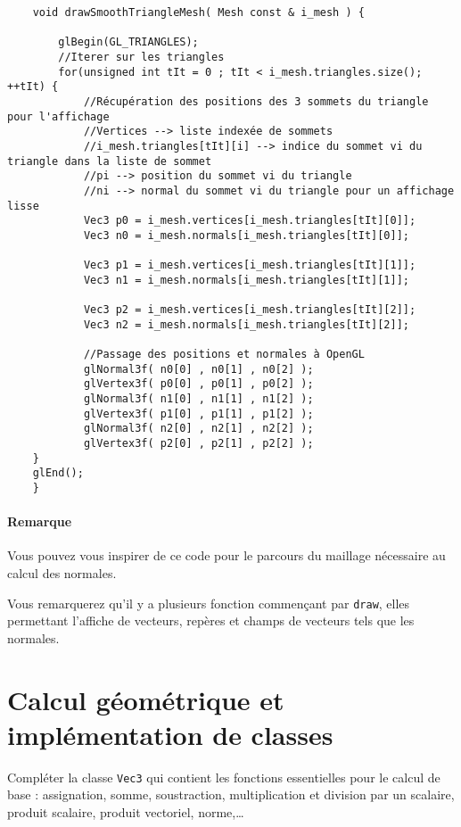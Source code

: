 \documentclass[a4paper,10pt]{tp_um}
\newcommand\code[1]{\texttt{#1}}
\begin{document}
\begin{verbatim}
    void drawSmoothTriangleMesh( Mesh const & i_mesh ) {
        
        glBegin(GL_TRIANGLES);
        //Iterer sur les triangles
        for(unsigned int tIt = 0 ; tIt < i_mesh.triangles.size(); ++tIt) {
            //Récupération des positions des 3 sommets du triangle pour l'affichage
            //Vertices --> liste indexée de sommets 
            //i_mesh.triangles[tIt][i] --> indice du sommet vi du triangle dans la liste de sommet 
            //pi --> position du sommet vi du triangle
            //ni --> normal du sommet vi du triangle pour un affichage lisse
            Vec3 p0 = i_mesh.vertices[i_mesh.triangles[tIt][0]];
            Vec3 n0 = i_mesh.normals[i_mesh.triangles[tIt][0]];

            Vec3 p1 = i_mesh.vertices[i_mesh.triangles[tIt][1]];
            Vec3 n1 = i_mesh.normals[i_mesh.triangles[tIt][1]];

            Vec3 p2 = i_mesh.vertices[i_mesh.triangles[tIt][2]];
            Vec3 n2 = i_mesh.normals[i_mesh.triangles[tIt][2]];

            //Passage des positions et normales à OpenGL
            glNormal3f( n0[0] , n0[1] , n0[2] );
            glVertex3f( p0[0] , p0[1] , p0[2] );
            glNormal3f( n1[0] , n1[1] , n1[2] );
            glVertex3f( p1[0] , p1[1] , p1[2] );
            glNormal3f( n2[0] , n2[1] , n2[2] );
            glVertex3f( p2[0] , p2[1] , p2[2] );
    }
    glEnd();
    }
 \end{verbatim}
\paragraph{Remarque}
Vous pouvez vous inspirer de ce code pour le parcours du maillage nécessaire au calcul des normales. 

Vous remarquerez qu'il y a plusieurs fonction commençant par \code{draw}, elles permettant l'affiche de vecteurs, repères et champs de vecteurs tels que les normales.
\section{Calcul géométrique et implémentation de classes}

\label{sec_exo_Vec3}

Compléter la classe \code{Vec3} qui contient les fonctions essentielles pour le calcul de base : assignation, somme, soustraction, multiplication et division par un scalaire, produit scalaire, produit vectoriel, norme,\ldots
\end{document}
